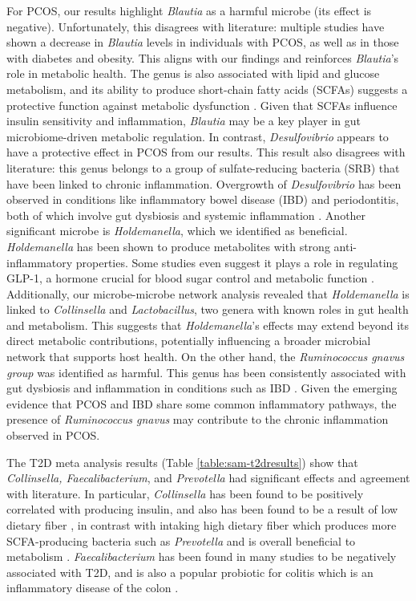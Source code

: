 \documentclass[12pt,letterpaper]{article}
\begin{document}
For PCOS, our results highlight \textit{Blautia} as a harmful microbe (its effect is negative). Unfortunately, this disagrees with literature: multiple studies have shown a decrease in \textit{Blautia} levels in individuals with PCOS, as well as in those with diabetes and obesity. This aligns with our findings and reinforces \textit{Blautia}’s role in metabolic health. The genus is also associated with lipid and glucose metabolism, and its ability to produce short-chain fatty acids (SCFAs) suggests a protective function against metabolic dysfunction \citep{li2023blautia}. Given that SCFAs influence insulin sensitivity and inflammation, \textit{Blautia} may be a key player in gut microbiome-driven metabolic regulation. In contrast, \textit{Desulfovibrio} appears to have a protective effect in PCOS from our results. This result also disagrees with literature: this genus belongs to a group of sulfate-reducing bacteria (SRB) that have been linked to chronic inflammation. Overgrowth of \textit{Desulfovibrio} has been observed in conditions like inflammatory bowel disease (IBD) and periodontitis, both of which involve gut dysbiosis and systemic inflammation \citep{singh2023desulfovibrio}. Another significant microbe is \textit{Holdemanella}, which we identified as beneficial. \textit{Holdemanella} has been shown to produce metabolites with strong anti-inflammatory properties. Some studies even suggest it plays a role in regulating GLP-1, a hormone crucial for blood sugar control and metabolic function \citep{romani2021holdemanella}. Additionally, our microbe-microbe network analysis revealed that \textit{Holdemanella} is linked to \textit{Collinsella} and \textit{Lactobacillus}, two genera with known roles in gut health and metabolism. This suggests that \textit{Holdemanella}’s effects may extend beyond its direct metabolic contributions, potentially influencing a broader microbial network that supports host health. On the other hand, the \textit{Ruminococcus gnavus group} was identified as harmful. This genus has been consistently associated with gut dysbiosis and inflammation in conditions such as IBD \citep{crost2023rgnavus}. Given the emerging evidence that PCOS and IBD share some common inflammatory pathways, the presence of \textit{Ruminococcus gnavus} may contribute to the chronic inflammation observed in PCOS. 

The T2D meta analysis results (Table \ref{table:sam-t2dresults}) show that \textit{Collinsella, Faecalibacterium}, and \textit{Prevotella} had significant effects and agreement with literature. In particular, \textit{Collinsella} has been found to be positively correlated with producing insulin, and also has been found to be a result of low dietary fiber \citep{gomez2018collinsella}, in contrast with intaking high dietary fiber which produces more SCFA-producing bacteria such as \textit{Prevotella} and is overall beneficial to metabolism \citep{abdelsalam2023prevotella}. \textit{Faecalibacterium} has been found in many studies to be negatively associated with T2D, and is also a popular probiotic for colitis which is an inflammatory disease of the colon \citep{gurung2020faecalibacterium}. 
\end{document}
